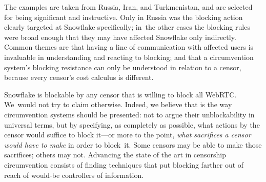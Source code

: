 \documentclass[letterpaper,twocolumn]{article}
\begin{document}
The examples are taken from
Russia, Iran, and Turkmenistan,
and are selected for being significant and instructive.
Only in Russia was the blocking action clearly targeted at Snowflake specifically;
in~the other cases the blocking rules were broad enough
that they may have affected Snowflake only indirectly.
Common themes are that having a line of communication
with affected users is invaluable in understanding and reacting to blocking;
and that a circumvention system's blocking resistance
can only be understood in relation to a censor,
because every censor's cost calculus is different.

Snowflake is blockable by any censor that is willing to block all WebRTC.
We~would not try to claim otherwise.
Indeed, we believe that is the way circumvention systems
should be presented:
not to argue their unblockability in universal terms,
but by specifying, as completely as possible,
what actions by the censor would suffice to block it---or
more to the point,
\emph{what sacrifices a censor would have to make}
in order to block~it.
Some censors may be able to make those sacrifices; others may not.
Advancing the state of the art in censorship circumvention
consists of finding techniques that put blocking
farther out of reach of would-be controllers of information.
\end{document}
